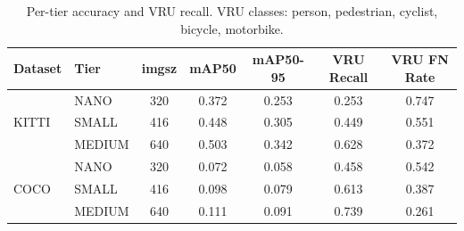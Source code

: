 \begin{table}[t]
\centering
\caption{Per-tier accuracy and VRU recall. VRU classes: person, pedestrian, cyclist, bicycle, motorbike.}
\label{tab:accuracy_per_tier}
\begin{tabular}{llccccc}
\toprule
Dataset & Tier & imgsz & mAP50 & mAP50-95 & VRU Recall & VRU FN Rate \\
\midrule
\multirow{3}{*}{KITTI} & NANO & 320 & 0.372 & 0.253 & 0.253 & 0.747 \\
 & SMALL & 416 & 0.448 & 0.305 & 0.449 & 0.551 \\
 & MEDIUM & 640 & 0.503 & 0.342 & 0.628 & 0.372 \\
\midrule
\multirow{3}{*}{COCO} & NANO & 320 & 0.072 & 0.058 & 0.458 & 0.542 \\
 & SMALL & 416 & 0.098 & 0.079 & 0.613 & 0.387 \\
 & MEDIUM & 640 & 0.111 & 0.091 & 0.739 & 0.261 \\
\bottomrule
\end{tabular}
\end{table}